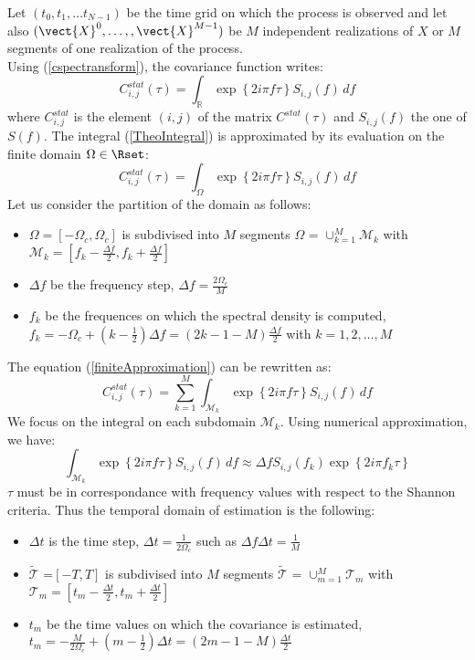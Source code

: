 Let $(t_{0},t_{1},\hdots t_{N-1})$ be the time grid on which the process is observed and let also $(\vect{X}^0, \dots, , \vect{X}^{M-1})$ be $M$ independent realizations of $X$ or $M$ segments of one realization of the process. \\
Using (\ref{cspectransform}), the covariance function writes:
\begin{equation}\label{TheoIntegral}
  C_{i,j}^{stat}(\tau)  = \int_{\mathbb{R}}\exp\left\{  2i\pi f \tau \right\} S_{i,j}(f)\, df
\end{equation}
where $C_{i,j}^{stat}$ is the element $(i,j)$ of the matrix $C^{stat}(\tau)$ and $S_{i,j}(f)$ the one of $S(f)$. The integral (\ref{TheoIntegral}) is approximated by its evaluation on the finite domain $\Omega \in \Rset$:
\begin{equation}\label{finiteApproximation}
  C_{i,j}^{stat}(\tau)  = \int_{\Omega}\exp\left\{  2i\pi f \tau \right\} S_{i,j}(f)\, df
\end{equation}
Let us consider the partition of the domain as follows:
\begin{itemize}
\item $\Omega =[-\Omega_c, \Omega_c]$ is subdivised into $M$ segments $\Omega$ = $\cup_{k=1}^{M} \mathcal{M}_k$ with $\mathcal{M}_k=[f_k - \frac{\Delta f}{2}, f_k + \frac{\Delta f}{2}]$
\item $\Delta f$ be the frequency step, $\Delta f = \frac{2 \Omega_c}{M}$
\item $f_k$ be the frequences on which the spectral density is computed, $f_k = -\Omega_c + \left(k - \frac{1}{2} \right) \Delta f = \left( 2 k - 1 - M \right) \frac{\Delta f}{2}$ with $k=1,2,\hdots,M$
\end{itemize}
The equation (\ref{finiteApproximation}) can be rewritten as:
\begin{equation*}
  C_{i,j}^{stat}(\tau)  = \sum_{k=1}^{M}\int_{\mathcal{M}_k}\exp\left\{  2i\pi f \tau \right\} S_{i,j}(f)\, df
\end{equation*}
We focus on the integral on each subdomain $\mathcal{M}_k$. Using numerical approximation, we have:
\begin{equation*}
  \int_{\mathcal{M}_k}\exp\left\{  2i\pi f \tau \right\} S_{i,j}(f)\, df \approx \Delta f S_{i,j}(f_k) \exp\left\{  2i\pi f_k \tau \right\}
\end{equation*}
$\tau$ must be in correspondance with frequency values with respect to the Shannon criteria. Thus the temporal domain of estimation is the following:
\begin{itemize}
\item $\Delta t$ is the time step, $\Delta t = \frac{1}{2 \Omega_c}$ such as $\Delta f \Delta t = \frac{1}{M}$
\item $\tilde{\mathcal{T}}$ =$[-T, T]$ is subdivised into $M$ segments $\tilde{{\mathcal{T}}}$ = $\cup_{m=1}^{M} \mathcal{T}_m$ with $\mathcal{T}_m=[t_m - \frac{\Delta t}{2}, t_m + \frac{\Delta t}{2}]$
\item $t_m$ be the time values on which the covariance is estimated, $t_m = -\frac{M}{2 \Omega_c} + \left(m - \frac{1}{2} \right) \Delta t = \left(2 m - 1 - M \right) \frac{\Delta t}{2}$
\end{itemize}
